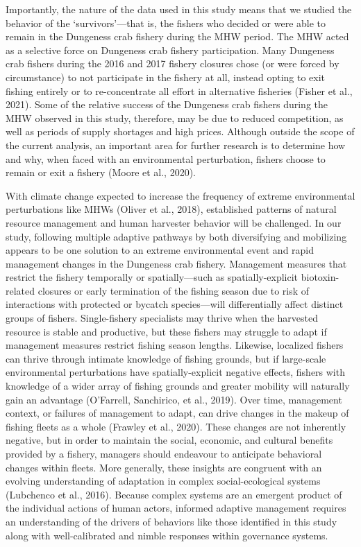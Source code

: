 \documentclass[]{elsarticle} %
\begin{document}
Importantly, the nature of the data used in this study means that we
studied the behavior of the `survivors'---that is, the fishers who
decided or were able to remain in the Dungeness crab fishery during the
MHW period. The MHW acted as a selective force on Dungeness crab fishery
participation. Many Dungeness crab fishers during the 2016 and 2017
fishery closures chose (or were forced by circumstance) to not
participate in the fishery at all, instead opting to exit fishing
entirely or to re-concentrate all effort in alternative fisheries
(Fisher et al., 2021). Some of the relative success of the Dungeness
crab fishers during the MHW observed in this study, therefore, may be
due to reduced competition, as well as periods of supply shortages and
high prices. Although outside the scope of the current analysis, an
important area for further research is to determine how and why, when
faced with an environmental perturbation, fishers choose to remain or
exit a fishery (Moore et al., 2020).

With climate change expected to increase the frequency of extreme
environmental perturbations like MHWs (Oliver et al., 2018), established
patterns of natural resource management and human harvester behavior
will be challenged. In our study, following multiple adaptive pathways
by both diversifying and mobilizing appears to be one solution to an
extreme environmental event and rapid management changes in the
Dungeness crab fishery. Management measures that restrict the fishery
temporally or spatially---such as spatially-explicit biotoxin-related
closures or early termination of the fishing season due to risk of
interactions with protected or bycatch species---will differentially
affect distinct groups of fishers. Single-fishery specialists may thrive
when the harvested resource is stable and productive, but these fishers
may struggle to adapt if management measures restrict fishing season
lengths. Likewise, localized fishers can thrive through intimate
knowledge of fishing grounds, but if large-scale environmental
perturbations have spatially-explicit negative effects, fishers with
knowledge of a wider array of fishing grounds and greater mobility will
naturally gain an advantage (O'Farrell, Sanchirico, et al., 2019). Over
time, management context, or failures of management to adapt, can drive
changes in the makeup of fishing fleets as a whole (Frawley et al.,
2020). These changes are not inherently negative, but in order to
maintain the social, economic, and cultural benefits provided by a
fishery, managers should endeavour to anticipate behavioral changes
within fleets. More generally, these insights are congruent with an
evolving understanding of adaptation in complex social-ecological
systems (Lubchenco et al., 2016). Because complex systems are an
emergent product of the individual actions of human actors, informed
adaptive management requires an understanding of the drivers of
behaviors like those identified in this study along with well-calibrated
and nimble responses within governance systems.
\end{document}
